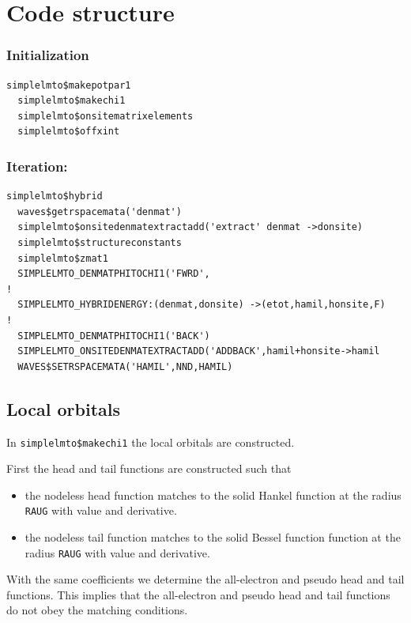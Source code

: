\documentclass[11pt,a4paper]{report}
\begin{document}
\section{Code structure}

\subsubsection{Initialization}
\begin{verbatim}
simplelmto$makepotpar1
  simplelmto$makechi1
  simplelmto$onsitematrixelements
  simplelmto$offxint
\end{verbatim}

\subsubsection{Iteration:}
\begin{verbatim}
simplelmto$hybrid
  waves$getrspacemata('denmat')
  simplelmto$onsitedenmatextractadd('extract' denmat ->donsite)
  simplelmto$structureconstants
  simplelmto$zmat1
  SIMPLELMTO_DENMATPHITOCHI1('FWRD',
!
  SIMPLELMTO_HYBRIDENERGY:(denmat,donsite) ->(etot,hamil,honsite,F)
!
  SIMPLELMTO_DENMATPHITOCHI1('BACK')
  SIMPLELMTO_ONSITEDENMATEXTRACTADD('ADDBACK',hamil+honsite->hamil
  WAVES$SETRSPACEMATA('HAMIL',NND,HAMIL)
\end{verbatim}

\subsection{Local orbitals}
In \verb|simplelmto$makechi1| the local orbitals are constructed.

First the head and tail functions are constructed such that 
\begin{itemize}
\item the nodeless head function matches to the solid Hankel function
  at the radius \verb|RAUG| with value and derivative.
\item the nodeless tail function matches to the solid Bessel function
  function at the radius \verb|RAUG| with value and derivative.
\end{itemize}
With the same coefficients we determine the all-electron and pseudo
head and tail functions. This implies that the all-electron and pseudo
head and tail functions do not obey the matching conditions.
\end{document}
